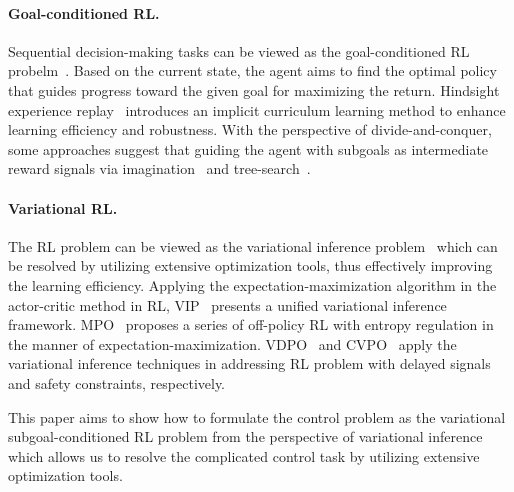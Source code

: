 \paragraph{Goal-conditioned RL.}
Sequential decision-making tasks can be viewed as the goal-conditioned RL probelm~\citep{liu2022goal}.
Based on the current state, the agent aims to find the optimal policy that guides progress toward the given goal for maximizing the return.
Hindsight experience replay~\citep{andrychowicz2017hindsight} introduces an implicit curriculum learning method to enhance learning efficiency and robustness.
With the perspective of divide-and-conquer, some approaches suggest that guiding the agent with subgoals as intermediate reward signals via imagination~\citep{chane2021goal, nair2019hierarchical} and tree-search~\citep{jurgenson2020sub, parascandolo2020divide}.


\paragraph{Variational RL.}
The RL problem can be viewed as the variational inference problem~\citep{levine2018reinforcement} which can be resolved by utilizing extensive optimization tools, thus effectively improving the learning efficiency.
Applying the expectation-maximization algorithm in the actor-critic method in RL, VIP~\citep{neumann2011variational} presents a unified variational inference framework.
MPO~\citep{abdolmaleki2018relative, abdolmaleki2018maximum} proposes a series of off-policy RL with entropy regulation in the manner of expectation-maximization. VDPO~\citep{wu2024variational} and CVPO~\citep{liu2022constrained} apply the variational inference techniques in addressing RL problem with delayed signals and safety constraints, respectively.

This paper aims to show how to formulate the control problem as the variational subgoal-conditioned RL problem from the perspective of variational inference which allows us to resolve the complicated control task by utilizing extensive optimization tools.

